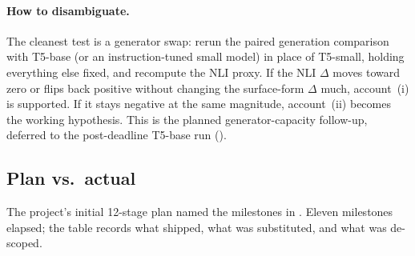 \documentclass[11pt,a4paper]{article}
\begin{document}
\paragraph{How to disambiguate.}  The cleanest test is a generator
swap: rerun the paired generation comparison with T5-base (or an
instruction-tuned small model) in place of T5-small, holding
everything else fixed, and recompute the NLI proxy.  If the NLI
$\Delta$ moves toward zero or flips back positive without changing
the surface-form $\Delta$ much, account~(i) is supported.  If it
stays negative at the same magnitude, account~(ii) becomes the
working hypothesis.  This is the planned generator-capacity follow-up, deferred
to the post-deadline T5-base run ().

\subsection{Plan vs.\ actual}
\label{sec:plan-vs-actual}

The project's initial 12-stage plan named the milestones in
.  Eleven milestones elapsed; the
table records what shipped, what was substituted, and what was
de-scoped.
\end{document}
